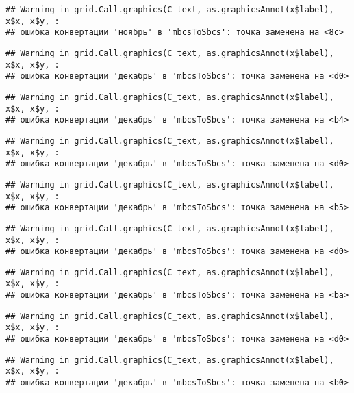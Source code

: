 \documentclass[
]{article}
\begin{document}
\begin{verbatim}
## Warning in grid.Call.graphics(C_text, as.graphicsAnnot(x$label), x$x, x$y, :
## ошибка конвертации 'ноябрь' в 'mbcsToSbcs': точка заменена на <8c>
\end{verbatim}

\begin{verbatim}
## Warning in grid.Call.graphics(C_text, as.graphicsAnnot(x$label), x$x, x$y, :
## ошибка конвертации 'декабрь' в 'mbcsToSbcs': точка заменена на <d0>
\end{verbatim}

\begin{verbatim}
## Warning in grid.Call.graphics(C_text, as.graphicsAnnot(x$label), x$x, x$y, :
## ошибка конвертации 'декабрь' в 'mbcsToSbcs': точка заменена на <b4>
\end{verbatim}

\begin{verbatim}
## Warning in grid.Call.graphics(C_text, as.graphicsAnnot(x$label), x$x, x$y, :
## ошибка конвертации 'декабрь' в 'mbcsToSbcs': точка заменена на <d0>
\end{verbatim}

\begin{verbatim}
## Warning in grid.Call.graphics(C_text, as.graphicsAnnot(x$label), x$x, x$y, :
## ошибка конвертации 'декабрь' в 'mbcsToSbcs': точка заменена на <b5>
\end{verbatim}

\begin{verbatim}
## Warning in grid.Call.graphics(C_text, as.graphicsAnnot(x$label), x$x, x$y, :
## ошибка конвертации 'декабрь' в 'mbcsToSbcs': точка заменена на <d0>
\end{verbatim}

\begin{verbatim}
## Warning in grid.Call.graphics(C_text, as.graphicsAnnot(x$label), x$x, x$y, :
## ошибка конвертации 'декабрь' в 'mbcsToSbcs': точка заменена на <ba>
\end{verbatim}

\begin{verbatim}
## Warning in grid.Call.graphics(C_text, as.graphicsAnnot(x$label), x$x, x$y, :
## ошибка конвертации 'декабрь' в 'mbcsToSbcs': точка заменена на <d0>
\end{verbatim}

\begin{verbatim}
## Warning in grid.Call.graphics(C_text, as.graphicsAnnot(x$label), x$x, x$y, :
## ошибка конвертации 'декабрь' в 'mbcsToSbcs': точка заменена на <b0>
\end{verbatim}
\end{document}
